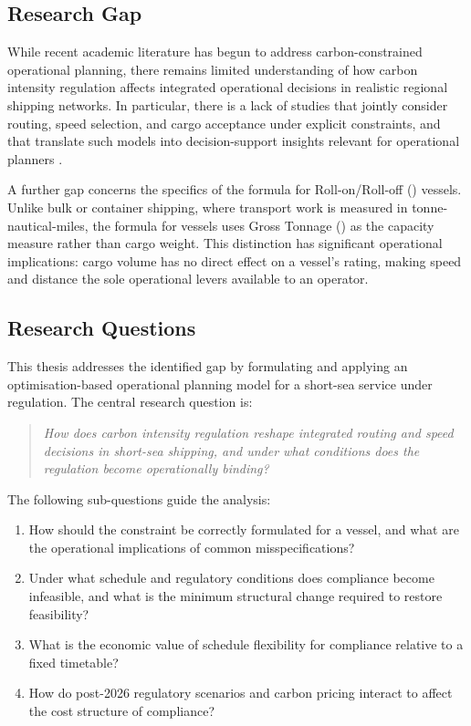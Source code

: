 \subsection{Research Gap}
\label{sec:intro:gap}

While recent academic literature has begun to address carbon-constrained
operational planning, there remains limited understanding of how carbon
intensity regulation affects integrated operational decisions in realistic
regional shipping networks. In particular, there is a lack of studies that
jointly consider routing, speed selection, and cargo acceptance under explicit
\CII{} constraints, and that translate such models into decision-support
insights relevant for operational planners \parencite{cheng2025cii}.

A further gap concerns the specifics of the \CII{} formula for Roll-on/Roll-off
(\RoRo{}) vessels. Unlike bulk or container shipping, where transport work is
measured in tonne-nautical-miles, the \IMO{} \CII{} formula for \RoRo{} vessels
uses Gross Tonnage (\GT{}) as the capacity measure rather than cargo weight.
This distinction has significant operational implications: cargo volume has no
direct effect on a \RoRo{} vessel's \CII{} rating, making speed and distance
the sole operational levers available to an operator.

\subsection{Research Questions}
\label{sec:intro:rq}

This thesis addresses the identified gap by formulating and applying an
optimisation-based operational planning model for a short-sea \RoRo{} service
under \CII{} regulation. The central research question is:

\begin{quote}
\itshape
How does carbon intensity regulation reshape integrated routing and speed
decisions in short-sea shipping, and under what conditions does the
regulation become operationally binding?
\end{quote}

The following sub-questions guide the analysis:

\begin{enumerate}
  \item How should the \CII{} constraint be correctly formulated for a
    \RoRo{} vessel, and what are the operational implications of common
    misspecifications?
  \item Under what schedule and regulatory conditions does \CII{} compliance
    become infeasible, and what is the minimum structural change required
    to restore feasibility?
  \item What is the economic value of schedule flexibility for \CII{}
    compliance relative to a fixed timetable?
  \item How do post-2026 regulatory scenarios and \ETS{} carbon pricing
    interact to affect the cost structure of compliance?
\end{enumerate}

